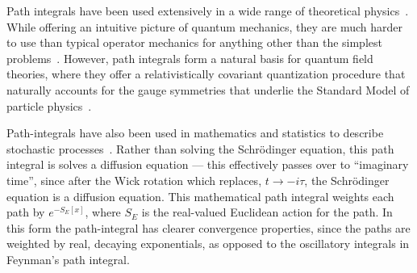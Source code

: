     Path integrals have been used extensively in a wide range of theoretical physics~\cite{Kleinert2012}.
    While offering an intuitive picture of quantum mechanics, they are much harder to use 
    than typical operator mechanics for anything other than the simplest problems~\cite{Feynman1965}.
    However, path integrals form a natural basis for quantum field theories, where they offer a relativistically covariant
    quantization procedure that naturally accounts for the gauge symmetries 
    that underlie the Standard Model of particle physics~\cite{Brown1994,Srednicki2008}.

    Path-integrals have also been used in mathematics and statistics to describe stochastic 
    processes~\cite{Kac1949,Durrett1996, Karatzas1991}.  Rather than solving the Schr\"odinger equation, 
    this path integral is solves a diffusion equation --- this effectively passes over to ``imaginary time'',
    since after the Wick rotation which replaces, $t\rightarrow -i \tau$, the Schr\"odinger equation is a diffusion equation.
    This mathematical path integral weights each path by $e^{-S_{E}[x]}$, where $S_E$ is the real-valued Euclidean action for the path.
    In this form the path-integral has clearer convergence properties, 
    since the paths are weighted by real, decaying exponentials, as opposed to the oscillatory integrals
    in Feynman's path integral.  

        
